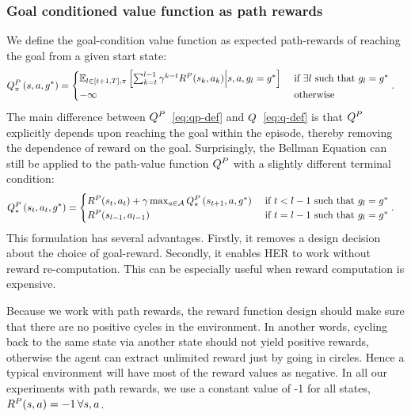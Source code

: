 \subsubsection{Goal conditioned value function as path rewards}
We define the goal-condition value function as expected path-rewards of reaching
the goal from a given start state:
%
\begin{align}
  \fwargs\state\act{\goal^*}\policy{P}
  &=
    \begin{cases}
      \E_{l \in [t+1, T], \policy}\left[ \sum_{k=t}^{l-1}
  \discount^{k-t} \Rew^P(\state_k, \act_k)
  \middle| \state, \act, \goal_l = \goal^* \right]
& \text{ if } \exists l \text{ such that } \goal_l = \goal^*
\\
-\infty & \text{ otherwise }
\end{cases}.
  \label{eq:qp-def}
\end{align}%
% 
The main difference between $Q^P$~\eqref{eq:qp-def} and $Q$~\eqref{eq:q-def}
is that $Q^P$ explicitly depends upon reaching the goal within the episode,
thereby removing the dependence of reward on the goal. Surprisingly, the Bellman
Equation can still be applied to the path-value function $Q^P$ with a slightly
different terminal condition:
%
\begin{align}
  \fwargs{\state_t}{\act_t}{\goal^*}*P
  &=
    \begin{cases}
      \Rew^P(\state_t, \act_t) + \discount \max_{\act \in \Action} \fwargs{\state_{t+1}}\act{\goal^*}*P
      & \text{ if } t < l-1 \text{ such that } \goal_l = \goal^*
      \\
      \Rew^P(\state_{l-1}, \act_{l-1}) & \text{ if } t = l-1 \text{ such that } \goal_l = \goal^*
    \end{cases}.
  \label{eq:bellman-path}
\end{align}%
% 
This formulation has several advantages. Firstly, it removes a design decision
about the choice of goal-reward. Secondly, it enables HER to work without reward
re-computation. This can be especially useful when reward computation is expensive.

Because we work with path rewards, the reward function design should
make sure that there are no positive cycles in the environment. In another
words, cycling back to the same state via another state should not yield
positive rewards, otherwise the agent can extract unlimited reward just by
going in circles. Hence a typical environment will have most of the reward
values as negative. In all our experiments with path rewards, we use a constant
value of -1 for all states, $R^P(s, a) = -1 \, \forall s, a$.


